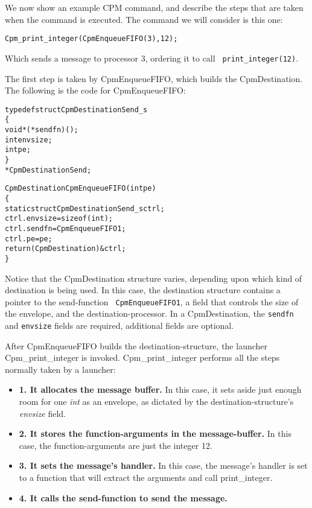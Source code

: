 We now show an example CPM command, and describe the steps that are
taken when the command is executed.  The command we will consider is
this one:

\begin{alltt}
Cpm_print_integer(CpmEnqueueFIFO(3), 12);
\end{alltt}

Which sends a message to processor 3, ordering it to call {\tt
print\_integer(12)}.

The first step is taken by CpmEnqueueFIFO, which builds the
CpmDestination.  The following is the code for CpmEnqueueFIFO:

\pagebreak

\begin{alltt}
typedef struct CpmDestinationSend_s
\{
  void *(*sendfn)();
  int envsize;
  int pe;
\}
*CpmDestinationSend;

CpmDestination CpmEnqueueFIFO(int pe)
\{
  static struct CpmDestinationSend_s ctrl;
  ctrl.envsize = sizeof(int);
  ctrl.sendfn  = CpmEnqueueFIFO1;
  ctrl.pe = pe;
  return (CpmDestination)&ctrl;
\}
\end{alltt}

Notice that the CpmDestination structure varies, depending upon which
kind of destination is being used.  In this case, the destination
structure contains a pointer to the send-function {\tt
CpmEnqueueFIFO1}, a field that controls the size of the envelope, and
the destination-processor.  In a CpmDestination, the {\tt sendfn} and
{\tt envsize} fields are required, additional fields are optional.

After CpmEnqueueFIFO builds the destination-structure, the launcher
Cpm\_print\_integer is invoked.  Cpm\_print\_integer performs all the
steps normally taken by a launcher:

\begin{itemize}

\item[]{{\bf 1. It allocates the message buffer.}  In this case, it sets aside
just enough room for one {\it int} as an envelope, as dictated by the
destination-structure's {\it envsize} field.}

\item[]{{\bf 2. It stores the function-arguments in the message-buffer.}  In
this case, the function-arguments are just the integer 12.}

\item[]{{\bf 3. It sets the message's handler.}  In this case, the message's
handler is set to a function that will extract the arguments and call
print\_integer.}

\item[]{{\bf 4. It calls the send-function to send the message.}}
\end{itemize}

